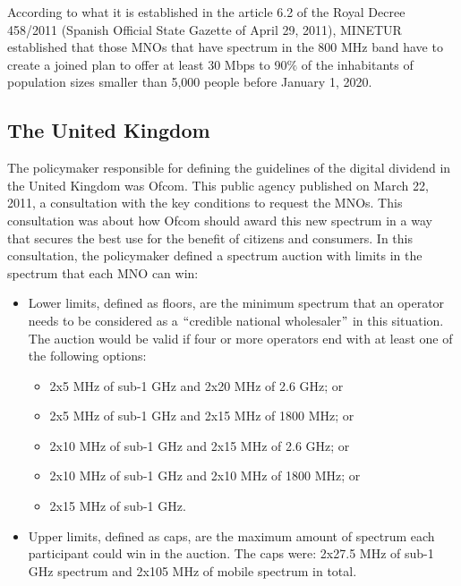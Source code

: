 {%

According to what it is established in the article 6.2 of the Royal Decree 458/2011 (Spanish Official State Gazette of April 29, 2011), MINETUR established that those MNOs that have spectrum in the 800 MHz band have to create a joined plan to offer at least 30 Mbps to 90$\%$  of the inhabitants of population sizes smaller than 5,000 people before January 1, 2020.\par




\subsection*{The United Kingdom}
The policymaker responsible for defining the guidelines of the digital dividend in the United Kingdom was Ofcom. This public agency published on March 22, 2011, a consultation \cite{2-13} with the key conditions to request the MNOs. This consultation was about how Ofcom should award this new spectrum in a way that secures the best use for the benefit of citizens and consumers. In this consultation, the policymaker defined a spectrum auction with limits in the spectrum that each MNO can win:\par
\begin{itemize}
	\item Lower limits, defined as floors, are the minimum spectrum that an operator needs to be considered as a $``$credible national wholesaler$"$  in this situation. The auction would be valid if four or more operators end with at least one of the following options:\par

\begin{itemize}
	\item 2x5 MHz of sub-1 GHz and 2x20 MHz of 2.6 GHz; or
	\item 2x5 MHz of sub-1 GHz and 2x15 MHz of 1800 MHz; or
	\item 2x10 MHz of sub-1 GHz and 2x15 MHz of 2.6 GHz; or
	\item 2x10 MHz of sub-1 GHz and 2x10 MHz of 1800 MHz; or
	\item 2x15 MHz of sub-1 GHz.\par
\end{itemize}
	\item Upper limits, defined as caps, are the maximum amount of spectrum each participant could win in the auction. The caps were: 2x27.5 MHz of sub-1 GHz spectrum and 2x105 MHz of mobile spectrum in total.\par
\end{itemize}

}
